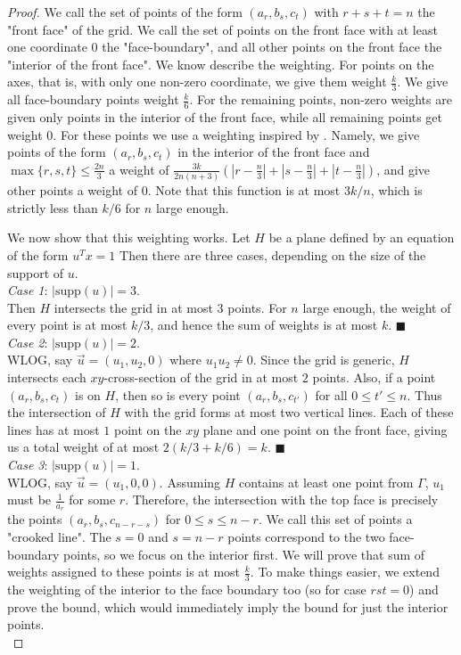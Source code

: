 \documentclass[usenames,dvipsnames, 11pt]{article}
\numberwithin{thm}{section}
\theoremstyle{definition}
\theoremstyle{definition}
\theoremstyle{definition}
\newcommand{\1}{\mathbf{1}}
\begin{document}
\begin{proof}
    We call the set of points of the form $(a_r,b_s,c_t)$ with $r+s+t=n$ the "front face" of the grid. We call the set of points on the front face with at least one coordinate $0$ the "face-boundary", and all other points on the front face the "interior of the front face". We know describe the weighting. For points on the axes, that is, with only one non-zero coordinate, we give them weight $\frac{k}{3}$. We give all face-boundary points weight $\frac{k}{6}$. 
    For the remaining points, non-zero weights are given only points in the interior of the front face, while all remaining points get weight $0$.
For these points we use a weighting inspired by \cite[Theorem 2.1]{basit2023covering}.
Namely, we give points of the form $(a_r,b_s,c_t)$ in the interior of the front face and $\max\{r,s,t\} \leq \frac{2n}{3}$ a weight of $\frac{3k}{2n(n+3)}(|r-\frac{n}{3}|+|s-\frac{n}{3}|+|t-\frac{n}{3}|)$, and give other points a weight of $0$. 
Note that this function is at most $3k/n$, which is strictly less than $k/6$ for $n$ large enough.

We now show that this weighting works. 
Let $H$ be a plane defined by an equation of the form $u^T x = 1$
Then there are three cases, depending on the size of the support of $u$. \\

\noindent
\textit{Case 1}: $|\mathrm{supp}(u)| = 3$. \\
Then $H$ intersects the grid in at most $3$ points. 
For $n$ large enough, 
the weight of every point is at most $k/3$, and hence the sum of weights is at most $k$. $\blacksquare$ \\

\noindent
\textit{Case 2}: $|\mathrm{supp}(u)| = 2$. \\
WLOG, say $\vec{u} = (u_1, u_2, 0)$ where $u_1u_2 \neq 0$. 
Since the grid is generic, $H$ intersects each $xy$-cross-section of the grid in at most $2$ points. Also, if a point $(a_r,b_s,c_t)$ is on $H$, then so is every point $(a_r,b_s,c_{t'})$ for all $0 \leq t' \leq n$. Thus the intersection of $H$ with the grid forms at most two vertical lines. 
Each of these lines has at most $1$ point on the $xy$ plane and one point on the front face, giving us a total weight of at most $2(k/3 + k/6) = k$. $\blacksquare$
\\

\noindent
\textit{Case 3}: $|\mathrm{supp}(u)| = 1$. \\
WLOG, say $\vec{u}=(u_1,0,0)$. Assuming $H$ contains at least one point from $\Gamma$, $u_1$ must be $\frac{1}{a_r}$ for some $r$. Therefore, the intersection with the top face is precisely the points $(a_r,b_s,c_{n-r-s})$ for $0 \leq s \leq n-r$. We call this set of points a "crooked line". The $s=0$ and $s=n-r$ points correspond to the two face-boundary points, so we focus on the interior first. We will prove that sum of weights assigned to these points is at most $\frac{k}{3}$. To make things easier, we extend the weighting of the interior to the face boundary too (so for case $rst=0$) and prove the bound, which would immediately imply the bound for just the interior points. \\


\end{proof}
\end{document}
